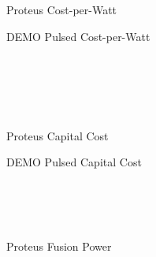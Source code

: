 \begin{figure*}
    \centering
    \hfill
    \begin{subfigure}[t]{0.45\textwidth}
        \centering
    \begin{adjustbox}{width=\textwidth}
      \Large
      
    \end{adjustbox}
        \caption{Proteus Cost-per-Watt}
    \end{subfigure}
    \hfill
    \begin{subfigure}[t]{0.45\textwidth}
        \centering
    \begin{adjustbox}{width=\textwidth}
      \Large
      
    \end{adjustbox}
        \caption{DEMO Pulsed Cost-per-Watt}
    \end{subfigure}
    \hfill \hfill ~\\ ~\\ ~\\ ~\\
    \hfill
    \begin{subfigure}[t]{0.45\textwidth}
        \centering
    \begin{adjustbox}{width=\textwidth}
      \Large
      
    \end{adjustbox}
        \caption{Proteus Capital Cost}
    \end{subfigure}
    \hfill
    \begin{subfigure}[t]{0.45\textwidth}
        \centering
    \begin{adjustbox}{width=\textwidth}
      \Large
      
    \end{adjustbox}
        \caption{DEMO Pulsed Capital Cost}
    \end{subfigure}
    \hfill \hfill ~\\ ~\\ ~\\
    \hfill
    \begin{subfigure}[t]{0.45\textwidth}
        \centering
    \begin{adjustbox}{width=\textwidth}
      \Large
      
    \end{adjustbox}
        \caption{Proteus Fusion Power}
    \end{subfigure}
    \hfill
    \begin{subfigure}[t]{0.45\textwidth}

\end{subfigure}
\end{figure*}

